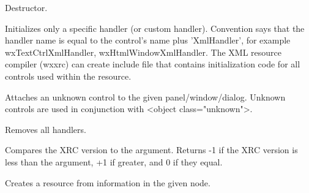 \label{wxxmlresourcedtor}


Destructor.

\label{wxxmlresourceaddhandler}


Initializes only a specific handler (or custom handler). Convention says
that the handler name is equal to the control's name plus 'XmlHandler', for example
wxTextCtrlXmlHandler, wxHtmlWindowXmlHandler. The XML resource compiler
(wxxrc) can create include file that contains initialization code for
all controls used within the resource.

\label{wxxmlresourceattachunknowncontrol}


Attaches an unknown control to the given panel/window/dialog.
Unknown controls are used in conjunction with <object class="unknown">.

\label{wxxmlresourceclearhandlers}


Removes all handlers.

\label{wxxmlresourcecompareversion}


Compares the XRC version to the argument. Returns -1 if the XRC version
is less than the argument, +1 if greater, and 0 if they equal.

\label{wxxmlresourcecreateresfromnode}


Creates a resource from information in the given node.

\label{wxxmlresourcedofindresource}



